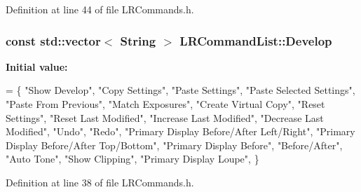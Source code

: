 Definition at line 44 of file L\+R\+Commands.\+h.

\subsubsection[{\texorpdfstring{Develop}{Develop}}]{\setlength{\rightskip}{0pt plus 5cm}const std\+::vector$<$ String $>$ L\+R\+Command\+List\+::\+Develop\hspace{0.3cm}{\ttfamily [static]}}\hypertarget{class_l_r_command_list_ac38ce74ea2a754c4915ea79b31d4686b}{}\label{class_l_r_command_list_ac38ce74ea2a754c4915ea79b31d4686b}
{\bfseries Initial value\+:}
\begin{DoxyCode}
= \{
    \textcolor{stringliteral}{"Show Develop"},
    \textcolor{stringliteral}{"Copy Settings"},
    \textcolor{stringliteral}{"Paste Settings"},
    \textcolor{stringliteral}{"Paste Selected Settings"},
    \textcolor{stringliteral}{"Paste From Previous"},
    \textcolor{stringliteral}{"Match Exposures"},
    \textcolor{stringliteral}{"Create Virtual Copy"},
    \textcolor{stringliteral}{"Reset Settings"},
    \textcolor{stringliteral}{"Reset Last Modified"},
    \textcolor{stringliteral}{"Increase Last Modified"},
    \textcolor{stringliteral}{"Decrease Last Modified"},
    \textcolor{stringliteral}{"Undo"},
    \textcolor{stringliteral}{"Redo"},
    \textcolor{stringliteral}{"Primary Display Before/After Left/Right"},
    \textcolor{stringliteral}{"Primary Display Before/After Top/Bottom"},
    \textcolor{stringliteral}{"Primary Display Before"},
    \textcolor{stringliteral}{"Before/After"},
    \textcolor{stringliteral}{"Auto Tone"},
    \textcolor{stringliteral}{"Show Clipping"},
    \textcolor{stringliteral}{"Primary Display Loupe"},
\}
\end{DoxyCode}


Definition at line 38 of file L\+R\+Commands.\+h.

